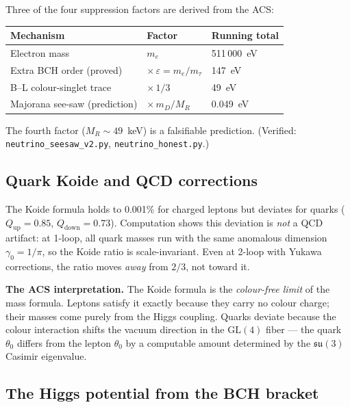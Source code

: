 \documentclass[11pt,a4paper]{article}
\theoremstyle{plain}
\theoremstyle{definition}
\theoremstyle{remark}
\begin{document}
Three of the four suppression factors are derived from the ACS:
\begin{center}
\begin{tabular}{lll}
\toprule
Mechanism & Factor & Running total \\
\midrule
Electron mass & $m_e$ & 511\,000~eV \\
Extra BCH order (proved) & $\times\,\varepsilon = m_e/m_\tau$ & 147~eV \\
B--L colour-singlet trace & $\times\,1/3$ & 49~eV \\
Majorana see-saw (prediction) & $\times\,m_D/M_R$ & 0.049~eV \\
\bottomrule
\end{tabular}
\end{center}
The fourth factor ($M_R \sim 49$~keV) is a falsifiable prediction.
(Verified: \texttt{neutrino\_seesaw\_v2.py}, \texttt{neutrino\_honest.py}.)

\subsection{Quark Koide and QCD corrections}

The Koide formula holds to 0.001\% for charged leptons but deviates
for quarks ($Q_{\mathrm{up}} = 0.85$, $Q_{\mathrm{down}} = 0.73$).
Computation shows this deviation is \emph{not} a QCD artifact:
at 1-loop, all quark masses run with the same anomalous dimension
$\gamma_0 = 1/\pi$, so the Koide ratio is scale-invariant.
Even at 2-loop with Yukawa corrections, the ratio moves \emph{away}
from $2/3$, not toward it.

\textbf{The ACS interpretation.}
The Koide formula is the \emph{colour-free limit} of the mass
formula.  Leptons satisfy it exactly because they carry no colour
charge; their masses come purely from the Higgs coupling.  Quarks
deviate because the colour interaction shifts the vacuum direction
in the $\mathrm{GL}(4)$ fiber --- the quark $\theta_0$ differs from
the lepton $\theta_0$ by a computable amount determined by the
$\mathfrak{su}(3)$ Casimir eigenvalue.

\subsection{The Higgs potential from the BCH bracket}
\end{document}

